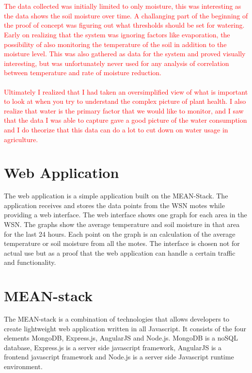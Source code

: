 \documentclass[]{uiophd}
\begin{document}
\\\\
\textcolor{red}{The data collected was initially limited to only moisture, this was interesting as the data shows the soil moisture over time. A challanging part of the beginning of the proof of concept was figuring out what thresholds should be set for watering. Early on realizing that the system was ignoring factors like evaporation, the possibility of also monitoring the temperature of the soil in addition to the moisture level. This was also gathered as data for the system and proved visually interesting, but was unfortunately never used for any analysis of correlation between temperature and rate of moisture reduction.
\\\\
Ultimately I realized that I had taken an oversimplified view of what is important to look at when you try to understand the complex picture of plant health. I also realize that water is the primary factor that we would like to monitor, and I saw that the data I was able to capture gave a good picture of the water consumption and I do theorize that this data can do a lot to cut down on water usage in agriculture.}

\section{Web Application}
The web application is a simple application built on the MEAN-Stack. The application receives and stores the data points from the WSN motes while providing a web interface. The web interface shows one graph for each area in the WSN. The graphs show the average temperature and soil moisture in that area for the last 24 hours. Each point on the graph is an calculation of the average temperature or soil moisture from all the motes. The interface is chosen not for actual use but as a proof that the web application can handle a certain traffic and functionality. 

\section{MEAN-stack}
The MEAN-stack is a combination of technologies that allows developers to create lightweight web application written in all Javascript. It consists of the four elements MongoDB, Express.js, AngularJS and Node.js. MongoDB is a noSQL database, Express.js is a server side javascript framework, AngularJS is a frontend javascript framework and Node.js is a server side Javascript runtime environment. 
\end{document}
